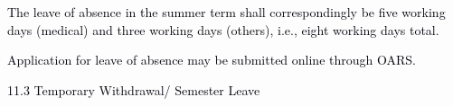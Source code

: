 \documentclass[12pt]{article}
\begin{document}
\vspace{\baselineskip}
\begin{justify}
{\fontsize{10pt}{12.0pt}\selectfont \textcolor[HTML]{00000A}{The leave of absence in the summer term shall correspondingly be five working days (medical) and three working days (others), i.e., eight working days total.}\par}
\end{justify}\par


\vspace{\baselineskip}
{\fontsize{10pt}{12.0pt}\selectfont \textcolor[HTML]{00000A}{Application for leave of absence may be submitted online through OARS.}\par}\par


\vspace{\baselineskip}
\textcolor[HTML]{00000A}{11.3 Temporary Withdrawal/ Semester Leave}\par
\end{document}
